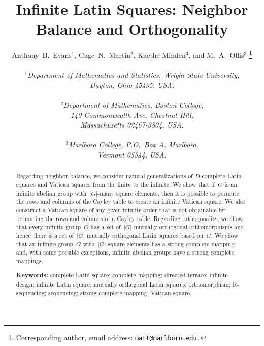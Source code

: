 \documentclass[12pt,a4paper]{article}
\begin{document}
\title{Infinite Latin Squares: Neighbor Balance and Orthogonality}

\author{Anthony~B.~Evans$^{1}$, Gage~N.~Martin$^{2}$, Kaethe Minden$^3$, and M.~A.~Ollis$^{3,}$\footnote{Corresponding author, email address: \texttt{matt@marlboro.edu.}}   \\
              \\
                {\it ${}^1$Department of Mathematics and Statistics, Wright State University,} \\    
              {\it Dayton, Ohio 45435, USA.} 
              \\
              \\
              {\it ${}^2$Department of Mathematics, Boston College,} \\
               {\it 140 Commonwealth Ave, Chestnut Hill,  } \\
              {\it  Massachusetts 02467-3804, USA.}
              \\
              \\
              {\it ${}^3$Marlboro College, P.O.~Box A, Marlboro,} \\    
              {\it Vermont 05344, USA.} }


\maketitle



\begin{abstract}
Regarding neighbor balance, we consider natural generalizations of $D$-complete Latin squares and Vatican squares from the finite to the infinite.   We show that if~$G$ is an infinite abelian group with~$|G|$-many square elements, then it is possible to permute the rows and columns of the Cayley table to create an infinite Vatican square. We also construct a Vatican square of any given infinite order that is not obtainable by permuting the rows and columns of a Cayley table.  Regarding orthogonality, we show that every infinite group~$G$ has a set of~$|G|$ mutually orthogonal orthomorphisms and hence there is a set of~$|G|$ mutually orthogonal Latin squares based on~$G$. We show that an infinite group~$G$ with~$|G|$ square elements has a strong complete mapping; and, with some possible exceptions, infinite abelian groups have a strong complete mappings.


\vspace{3mm}
\noindent
{\bf Keywords:} complete Latin square; complete mapping; directed terrace; infinite design; infinite Latin square; mutually orthogonal Latin squares; orthomorphism; R-sequencing; sequencing; strong complete mapping; Vatican square.
\end{abstract}
\end{document}
